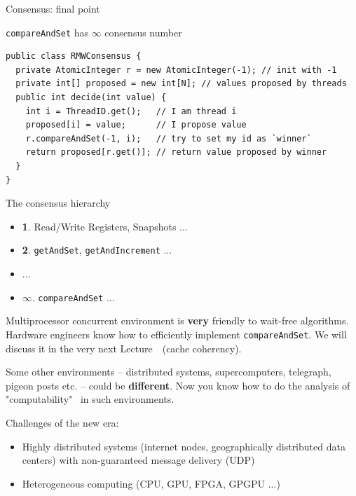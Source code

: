 \begin{frame}{Consensus: final point}
\begin{theorem}
\texttt{compareAndSet} has $\infty$ consensus number
\end{theorem}

\pause

\begin{verbatim}
public class RMWConsensus {
  private AtomicInteger r = new AtomicInteger(-1); // init with -1
  private int[] proposed = new int[N]; // values proposed by threads
  public int decide(int value) { 
    int i = ThreadID.get();   // I am thread i
    proposed[i] = value;      // I propose value
    r.compareAndSet(-1, i);   // try to set my id as `winner`
    return proposed[r.get()]; // return value proposed by winner
  }
}
\end{verbatim}
\end{frame}


\begin{frame}[fragile]{The consensus hierarchy}

\begin{itemize}
  \item \textbf{1}. Read/Write Registers, Snapshots ...

  \item \textbf{2}. \texttt{getAndSet}, \texttt{getAndIncrement} ...

  \item ...

  \item $\infty$. \texttt{compareAndSet} ...
\end{itemize}

\pause

Multiprocessor concurrent environment is \textbf{very} friendly to wait-free algorithms. Hardware engineers know how to efficiently implement \texttt{compareAndSet}.
\pause We will discuss it in the very next Lecture~\cacheCoherencyNum \ (cache coherency).

\pause
Some other environments -- distributed systems, supercomputers, telegraph, pigeon posts etc. -- could be \textbf{different}. Now you know how to do the analysis of "computability" \ in such environments.

\pause
Challenges of the new era:
\begin{itemize}
  \item Highly distributed systems (internet nodes, geographically distributed data centers) with non-guaranteed message delivery (UDP)
  \item Heterogeneous computing (CPU, GPU, FPGA, GPGPU ...)
\end{itemize}

\end{frame}

